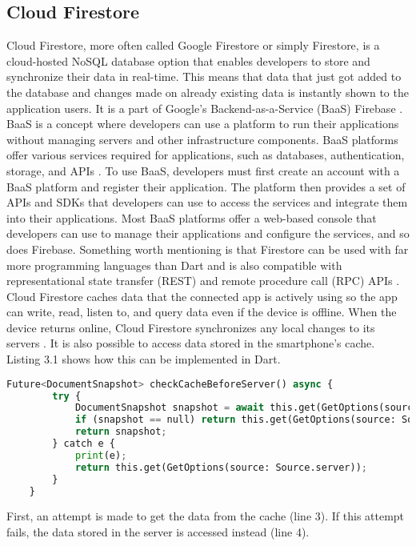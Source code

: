 \subsection{Cloud Firestore}
Cloud Firestore, more often called Google Firestore or simply Firestore, is a cloud-hosted NoSQL database option that enables developers to store and synchronize their data in real-time. This means that data that just got added to the database and changes made on already existing data is instantly shown to the application users. It is a part of Google's Backend-as-a-Service (BaaS) Firebase \cite[p. 458 ]{.baasfirebase}. BaaS is a concept where developers can use a platform to run their applications without managing servers and other infrastructure components. BaaS platforms offer various services required for applications, such as databases, authentication, storage, and APIs \cite{.baasokta}. To use BaaS, developers must first create an account with a BaaS platform and register their application. The platform then provides a set of APIs and SDKs that developers can use to access the services and integrate them into their applications. Most BaaS platforms offer a web-based console that developers can use to manage their applications and configure the services, and so does Firebase. Something worth mentioning is that Firestore can be used with far more programming languages than Dart and is also compatible with representational state transfer (REST) and remote procedure call (RPC) APIs \cite{.firestore}.
\newline \\
Cloud Firestore caches data that the connected app is actively using so the app can write, read, listen to, and query data even if the device is offline. When the device returns online, Cloud Firestore synchronizes any local changes to its servers \cite{.firestore}. It is also possible to access data stored in the smartphone's cache. Listing 3.1 shows how this can be implemented in Dart.

\begin{lstlisting}[language=Python, caption={Firestore and Dart - getting Cache-data}]
	Future<DocumentSnapshot> checkCacheBeforeServer() async {
		try {
			DocumentSnapshot snapshot = await this.get(GetOptions(source: Source.cache));
			if (snapshot == null) return this.get(GetOptions(source: Source.server));
			return snapshot;
		} catch e {
			print(e);
			return this.get(GetOptions(source: Source.server));
		}
	}	
\end{lstlisting}
\noindent
First, an attempt is made to get the data from the cache (line 3). If this attempt fails, the data stored in the server is accessed instead (line 4).

